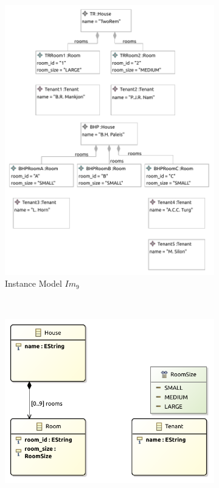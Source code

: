 \begin{figure}[p]
    \centering
    \begin{subfigure}{0.98\textwidth}
        \centering
        \includegraphics{images/06_application/instance_model/step09.pdf}
        \caption{Instance Model $Im_9$}
        \label{fig:application:building_the_model:tenant_names:ecore:instance_model}
    \end{subfigure}
    \\
    \begin{subfigure}{0.98\textwidth}
        \centering
        \includegraphics{images/06_application/type_model/step09.pdf}

\end{subfigure}
\end{figure}
